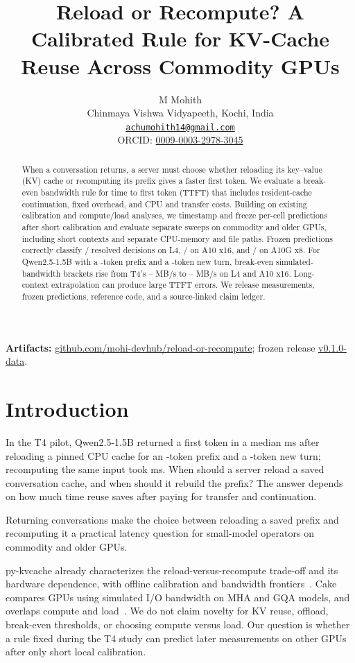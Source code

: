 \documentclass[10pt]{article}
\title{Reload or Recompute? A Calibrated Rule for KV-Cache Reuse Across Commodity GPUs}
\author{M Mohith\\
\small Chinmaya Vishwa Vidyapeeth, Kochi, India\\
\small\href{mailto:achumohith14@gmail.com}{\nolinkurl{achumohith14@gmail.com}}\\
\small ORCID: \href{https://orcid.org/0009-0003-2978-3045}{0009-0003-2978-3045}}
\date{}
\begin{document}
\maketitle
\begin{abstract}
When a conversation returns, a server must choose whether reloading its key--value (KV) cache or recomputing its prefix gives a faster first token. We evaluate a break-even bandwidth rule for time to first token (TTFT) that includes resident-cache continuation, fixed overhead, and CPU and transfer costs. Building on existing calibration and compute/load analyses, we timestamp and freeze per-cell predictions after short calibration and evaluate separate sweeps on commodity and older GPUs, including short contexts and separate CPU-memory and file paths. Frozen predictions correctly classify / resolved decisions on L4, / on A10 x16, and / on A10G x8. For Qwen2.5-1.5B with a -token prefix and a -token new turn, break-even simulated-bandwidth brackets rise from T4's -- MB/s to -- MB/s on L4 and A10 x16. Long-context extrapolation can produce large TTFT errors. We release measurements, frozen predictions, reference code, and a source-linked claim ledger.
\end{abstract}
\noindent\textbf{Artifacts:} \href{https://github.com/mohi-devhub/reload-or-recompute}{github.com/mohi-devhub/reload-or-recompute}; frozen release \href{https://github.com/mohi-devhub/reload-or-recompute/releases/tag/v0.1.0-data}{v0.1.0-data}.

\section{Introduction}
In the T4 pilot, Qwen2.5-1.5B returned a first token in a median  ms after reloading a pinned CPU cache for an -token prefix and a -token new turn; recomputing the same input took  ms. When should a server reload a saved conversation cache, and when should it rebuild the prefix? The answer depends on how much time reuse saves after paying for transfer and continuation.

Returning conversations make the choice between reloading a saved prefix and recomputing it a practical latency question for small-model operators on commodity and older GPUs.

py-kvcache already characterizes the reload-versus-recompute trade-off and its hardware dependence, with offline calibration and bandwidth frontiers~\cite{pykvcache}. Cake compares GPUs using simulated I/O bandwidth on MHA and GQA models, and overlaps compute and load~\cite{cake}. We do not claim novelty for KV reuse, offload, break-even thresholds, or choosing compute versus load. Our question is whether a rule fixed during the T4 study can predict later measurements on other GPUs after only short local calibration.
\end{document}
